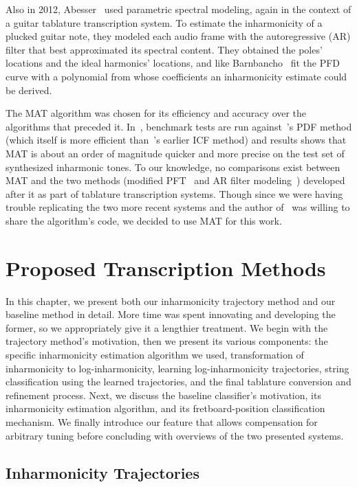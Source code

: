 \documentclass[12pt]{cmuthesis}
\begin{document}
Also in 2012, Abesser~\cite{abesser2012} used parametric spectral modeling, again in the context of a guitar tablature transcription system. To estimate the inharmonicity of a plucked guitar note, they modeled each audio frame with the autoregressive (AR) filter that best approximated its spectral content. They obtained the poles' locations and the ideal harmonics' locations, and like Barnbancho~\cite{barbanchoi2012} fit the PFD curve with a polynomial from whose coefficients an inharmonicity estimate could be derived.

The MAT algorithm was chosen for its efficiency and accuracy over the algorithms that preceded it. In~\cite{hodgkinson2009}, benchmark tests are run against~\cite{rauhala2007}'s PDF method (which itself is more efficient than~\cite{galembo1999}'s earlier ICF method) and results shows that MAT is about an order of magnitude quicker and more precise on the test set of synthesized inharmonic tones. To our knowledge, no comparisons exist between MAT and the two methods (modified PFT~\cite{barbanchoi2012} and AR filter modeling~\cite{abesser2012}) developed after it as part of tablature transcription systems. Though since we were having trouble replicating the two more recent systems and the author of~\cite{hodgkinson2009} was willing to share the algorithm's code, we decided to use MAT for this work.

\noindent
\chapter{Proposed Transcription Methods}
\label{chap:method}
In this chapter, we present both our inharmonicity trajectory method and our baseline method in detail. More time was spent innovating and developing the former, so we appropriately give it a lengthier treatment. We begin with the trajectory method's motivation, then we present its various components: the specific inharmonicity estimation algorithm we used, transformation of inharmonicity to log-inharmonicity, learning log-inharmonicity trajectories, string classification using the learned trajectories, and the final tablature conversion and refinement process. Next, we discuss the baseline classifier's motivation, its inharmonicity estimation algorithm, and its fretboard-position classification mechanism. We finally introduce our feature that allows compensation for arbitrary tuning before concluding with overviews of the two presented systems.

\section{Inharmonicity Trajectories}
\end{document}
